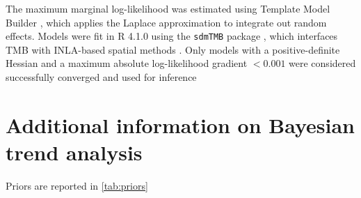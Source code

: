 \documentclass[lineno,pdflatex,sn-nature]{sn-jnl}%
\begin{document}
\begin{appendices}
The maximum marginal log-likelihood was estimated using Template Model Builder \citep[TMB;][]{kristensen_tmb_2016}, which applies the Laplace approximation to integrate out random effects. Models were fit in R 4.1.0 \citep{r_core_team_r_2021} using the \texttt{sdmTMB} package \citep{anderson_sdmtmb_2024}, which interfaces TMB with INLA-based spatial methods \citep{rue_approximate_2009}. Only models with a positive-definite Hessian and a maximum absolute log-likelihood gradient $< 0.001$ were considered successfully converged and used for inference \citep{anderson_sdmtmb_2024}


\section{Additional information on Bayesian trend analysis}\label{Appendix C}

Priors are reported in \ref{tab:priors}






\end{appendices}


\end{document}
